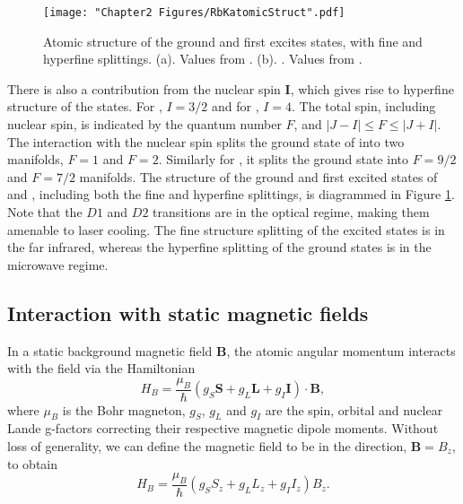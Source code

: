 \begin{figure}
	\texttt{[image: "Chapter2 Figures/RbKatomicStruct".pdf]}
\caption[Atomic structure of the ground and first excites states]{Atomic structure of the ground and first excites states, with fine and hyperfine splittings. (a)\Rb{}. Values from \cite{Steck}. (b). \K{}. Values from \cite{Tiecke}.}
\label{fig:RbKatomicStruct}
\end{figure}

There is also a contribution from the nuclear spin $\mathbf{I}$, which gives rise to hyperfine structure of the states. For \Rb{}, $I=3/2$ and for \K{}, $I=4$. The total spin, including nuclear spin, is indicated by the quantum number $F$, and $|J - I| \leq F \leq |J + I|$. The interaction with the nuclear spin splits the ground state of \Rb{} into two manifolds, $F=1$ and $F=2$. Similarly for \K{}, it splits the ground state into $F=9/2$ and $F=7/2$ manifolds. The structure of the ground and first excited states of \Rb{} and \K{}, including both the fine and hyperfine splittings, is diagrammed in Figure \ref{fig:RbKatomicStruct}. Note that the $D1$ and $D2$ transitions are in the optical regime, making them amenable to laser cooling. The fine structure splitting of the excited states is in the far infrared, whereas the hyperfine splitting of the ground states is in the microwave regime.  

\subsection{Interaction with static magnetic fields}\label{sec:hyperfineField}
In a static background magnetic field $\mathbf{B}$, the atomic angular momentum interacts with the field via the Hamiltonian
\begin{equation}
H_B = \frac{\mu_B}{\hbar}(g_S\mathbf{S}+g_L\mathbf{L}+g_I\mathbf{I})\cdot\mathbf{B},
\end{equation}
where $\mu_B$ is the Bohr magneton, $g_S$, $g_L$ and $g_I$ are the spin, orbital and nuclear Lande g-factors correcting their respective magnetic dipole moments. Without loss of generality, we can define the magnetic field to be in the \ez{} direction, $\mathbf{B}=B_z$\ez{}, to obtain
\begin{equation}
H_B = \frac{\mu_B}{\hbar}(g_S S_z+g_L L_z+g_I I_z) B_z.
\label{eqn:BHam}
\end{equation}

